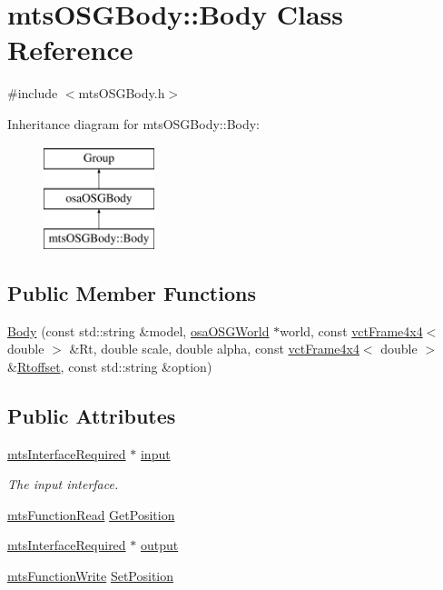 \hypertarget{classmts_o_s_g_body_1_1_body}{}\section{mts\+O\+S\+G\+Body\+:\+:Body Class Reference}
\label{classmts_o_s_g_body_1_1_body}


{\ttfamily \#include $<$mts\+O\+S\+G\+Body.\+h$>$}

Inheritance diagram for mts\+O\+S\+G\+Body\+:\+:Body\+:\begin{figure}[H]
\begin{center}
\leavevmode
\includegraphics[height=3.000000cm]{d0/db8/classmts_o_s_g_body_1_1_body}
\end{center}
\end{figure}
\subsection*{Public Member Functions}
\begin{DoxyCompactItemize}
\item 
\hyperlink{classmts_o_s_g_body_1_1_body_a90f9629d468e6233a1f95ad531d8ef9e}{Body} (const std\+::string \&model, \hyperlink{classosa_o_s_g_world}{osa\+O\+S\+G\+World} $\ast$world, const \hyperlink{classvct_frame4x4}{vct\+Frame4x4}$<$ double $>$ \&Rt, double scale, double alpha, const \hyperlink{classvct_frame4x4}{vct\+Frame4x4}$<$ double $>$ \&\hyperlink{classosa_o_s_g_body_ad008984bdb0eda300948932eda13974a}{Rtoffset}, const std\+::string \&option)
\end{DoxyCompactItemize}
\subsection*{Public Attributes}
\begin{DoxyCompactItemize}
\item 
\hyperlink{classmts_interface_required}{mts\+Interface\+Required} $\ast$ \hyperlink{classmts_o_s_g_body_1_1_body_aa2d2a5a5c949a112419c36ebf4a8dd2a}{input}
\begin{DoxyCompactList}\small\item\em The input interface. \end{DoxyCompactList}\item 
\hyperlink{classmts_function_read}{mts\+Function\+Read} \hyperlink{classmts_o_s_g_body_1_1_body_a791a30456a61f93a32dbcc663cd4fc01}{Get\+Position}
\item 
\hyperlink{classmts_interface_required}{mts\+Interface\+Required} $\ast$ \hyperlink{classmts_o_s_g_body_1_1_body_a811a794749b145589bf15a97719166a7}{output}
\item 
\hyperlink{classmts_function_write}{mts\+Function\+Write} \hyperlink{classmts_o_s_g_body_1_1_body_a840993fc4f30facfdf722b7f0df04869}{Set\+Position}
\end{DoxyCompactItemize}
